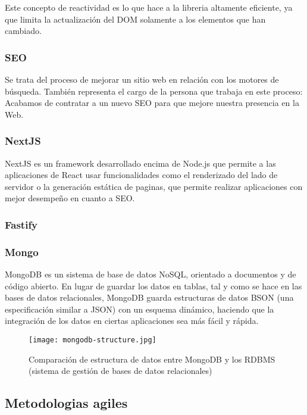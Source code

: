         Este concepto de reactividad es lo que hace a la libreria altamente eficiente, ya que limita la actualización del DOM solamente a los elementos que han cambiado.
        
    \subsubsection{SEO}
    
        Se trata del proceso de mejorar un sitio web en relación con los motores de búsqueda. También representa el cargo de la persona que trabaja en este proceso: Acabamos de contratar a un nuevo SEO para que mejore nuestra presencia en la Web.

    \subsubsection{NextJS}

        NextJS es un framework desarrollado encima de Node.js que permite a las aplicaciones de React usar funcionalidades como el renderizado del lado de servidor o la generación estática de paginas, que permite realizar aplicaciones con mejor desempeño en cuanto a SEO.


    \subsubsection{Fastify}

    \subsubsection{Mongo}

        MongoDB es un sistema de base de datos NoSQL, orientado a documentos y de código abierto. En lugar de guardar los datos en tablas, tal y como se hace en las bases de datos relacionales, MongoDB guarda estructuras de datos BSON (una especificación similar a JSON) con un esquema dinámico, haciendo que la integración de los datos en ciertas aplicaciones sea más fácil y rápida.

        \begin{figure}
            \texttt{[image: mongodb-structure.jpg]}
            \caption{Comparación de estructura de datos entre MongoDB y los RDBMS (sistema de gestión de bases de datos relacionales)}
        \end{figure}


\subsection{Metodologias agiles}



